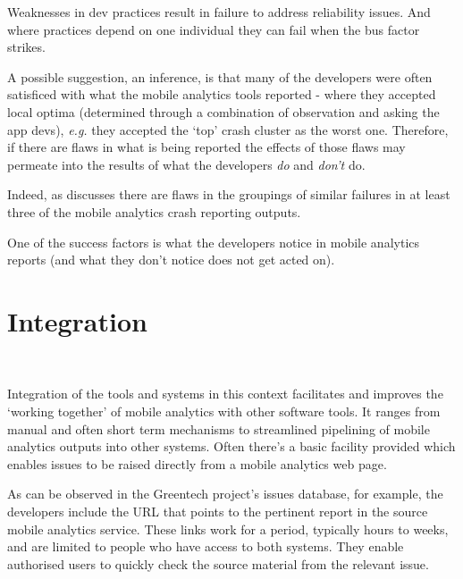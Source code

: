 Weaknesses in dev practices result in failure to address reliability issues. And where practices depend on one individual they can fail when the bus factor strikes. 

A possible suggestion, an inference, is that many of the developers were often satisficed with what the mobile analytics tools reported - where they accepted local optima (determined through a combination of observation and asking the app devs), \textit{e.g.} they accepted the `top' crash cluster as the worst one. Therefore, if there are flaws in what is being reported the effects of those flaws may permeate into the results of what the developers \textit{do} and \textit{don't} do.

Indeed, as  discusses there are flaws in the groupings of similar failures in at least three of the mobile analytics crash reporting outputs.

One of the success factors is what the developers notice in mobile analytics reports (and what they don't notice does not get acted on).

\section{Integration}~\label{aiu-integration-section}

Integration of the tools and systems in this context facilitates and improves the `working together' of mobile analytics with other software tools. It ranges from manual and often short term mechanisms to streamlined pipelining of mobile analytics outputs into other systems. Often there's a basic facility provided which enables issues to be raised directly from a mobile analytics web page.

As can be observed in the Greentech project's issues database, for example, the developers include the URL that points to the pertinent report in the source mobile analytics service. These links work for a period, typically hours to weeks, and are limited to people who have access to both systems. They enable authorised users to quickly check the source material from the relevant issue. 

